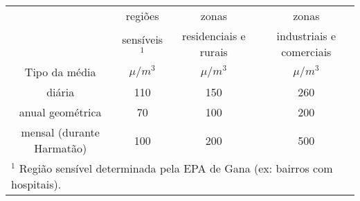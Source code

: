 \begin{tabular}{cccc}
\hline
                              &   regiões  &        zonas       &         zonas               \\
                              & sensíveis$^1$  & residenciais e rurais & industriais e comerciais      \\
Tipo da média                 & $\mu / m^3$ & $\mu / m^3$ & $\mu / m^3$      \\
\hline
diária                    & 110             & 150                      & 260         \\       
anual geométrica          & 70              & 100                      & 200                   \\
mensal (durante Harmatão) & 100             & 200                      & 500                     \\
\hline
\multicolumn{4}{l}{$^1$ Região sensível determinada pela EPA de Gana (ex: bairros com hospitais).} \\
\hline
\end{tabular}
